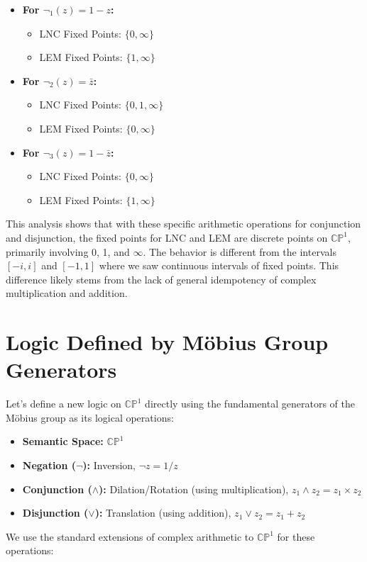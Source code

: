 	\begin{itemize}
		\item \textbf{For $\neg_1(z) = 1 - z$:}
		\begin{itemize}
			\item LNC Fixed Points: $\{0, \infty\}$
			\item LEM Fixed Points: $\{1, \infty\}$
		\end{itemize}
		
		\item \textbf{For $\neg_2(z) = \bar{z}$:}
		\begin{itemize}
			\item LNC Fixed Points: $\{0, 1, \infty\}$
			\item LEM Fixed Points: $\{0, \infty\}$
		\end{itemize}
		
		\item \textbf{For $\neg_3(z) = 1 - \bar{z}$:}
		\begin{itemize}
			\item LNC Fixed Points: $\{0, \infty\}$
			\item LEM Fixed Points: $\{1, \infty\}$
		\end{itemize}
	\end{itemize}
	This analysis shows that with these specific arithmetic operations for conjunction and disjunction, the fixed points for LNC and LEM are discrete points on $\mathbb{CP}^1$, primarily involving 0, 1, and $\infty$. The behavior is different from the intervals $[-i, i]$ and $[-1, 1]$ where we saw continuous intervals of fixed points. This difference likely stems from the lack of general idempotency of complex multiplication and addition.
	
	\section{Logic Defined by M\"{o}bius Group Generators}
	
	Let's define a new logic on $\mathbb{CP}^1$ directly using the fundamental generators of the M\"{o}bius group as its logical operations:
	
	\begin{itemize}
		\item \textbf{Semantic Space:} $\mathbb{CP}^1$
		
		\item \textbf{Negation ($\neg$):} Inversion, $\neg z = 1/z$
		
		\item \textbf{Conjunction ($\wedge$):} Dilation/Rotation (using multiplication), $z_1 \wedge z_2 = z_1 \times z_2$
		
		\item \textbf{Disjunction ($\vee$):} Translation (using addition), $z_1 \vee z_2 = z_1 + z_2$
	\end{itemize}
	We use the standard extensions of complex arithmetic to $\mathbb{CP}^1$ for these operations:
	
